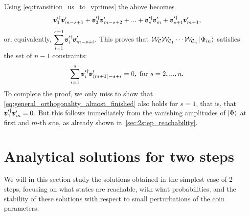 Using \cref{eq:transition_us_to_vprimes} the above becomes
\begin{equation*}
	\pmb{v}^{\prime\dagger}_1 \pmb{v}^\prime_{m-s+1} +
	\pmb{v}^{\prime\dagger}_2 \pmb{v}^\prime_{m-s+2} +
	... +
	\pmb{v}^{\prime\dagger}_s \pmb{v}^\prime_m +
	\pmb{v}^{\prime\dagger}_{s+1} \pmb{v}^\prime_{m+1},
\end{equation*}
or, equivalently,
$\displaystyle
	\sum_{i=1}^{s+1} \pmb{v}^{\prime\dagger}_i \pmb{v}^\prime_{m-s+i}.
$
This proves that
$
	\mathcal W_{\mathcal C}\mathcal W_{\mathcal C_1} \cdots \mathcal W_{\mathcal C_{n}}
	\ket{\Phi_{in}}
$
satisfies the set of $n-1$ constraints:
\begin{equation}
	\sum_{i=1}^{s}
	\pmb{v}^{\prime\dagger}_i
	\pmb{v}^\prime_{(m+1)-s+i} = 0,
	\text{ for }
	s = 2,...,n.
	\label{eq:general_orthogonality_almost_finished}
\end{equation}
To complete the proof, we only miss to show that \cref{eq:general_orthogonality_almost_finished} also holds for $s=1$, that is, that
$\pmb{v}^{\prime\dagger}_1 \pmb{v}^\prime_m = 0$.
But this follows immediately from the vanishing amplitudes of $\ket\Phi$ at first and $m$-th site, as already shown in~\cref{sec:2step_reachability}.

\section{Analytical solutions for two steps}
\label{app:analytical_sol_2steps}
We will in this section study the solutions obtained in the simplest case of 2 steps, focusing on what states are reachable, with what probabilities, and the stability of these solutions with respect to small perturbations of the coin parameters.

